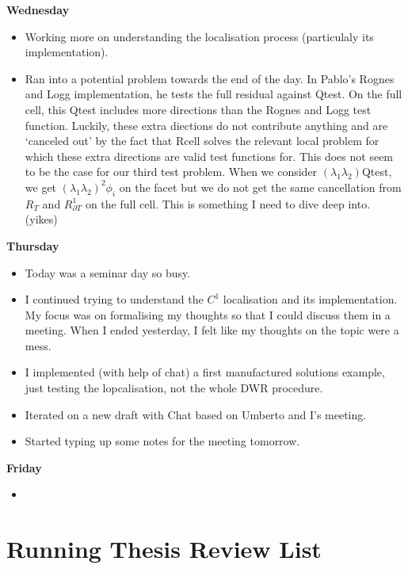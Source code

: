 \documentclass[12pt,a4paper]{article}
\begin{document}
\textbf{Wednesday}

\begin{itemize}
    \item Working more on understanding the localisation process (particulaly its implementation).
    \item Ran into a potential problem towards the end of the day. In Pablo's Rognes and Logg implementation, he tests the full residual against Qtest. On the full cell, this Qtest includes more directions than the Rognes and Logg test function. Luckily, these extra diections do not contribute anything and are `canceled out' by the fact that Rcell solves the relevant local problem for which these extra directions are valid test functions for. This does not seem to be the case for our third test problem. When we consider $(\lambda_1 \lambda_2)$Qtest, we get $(\lambda_1\lambda_2)^2 \phi_i$ on the facet but we do not get the same cancellation from $R_T$ and $R_{\partial T}^1$ on the full cell. This is something I need to dive deep into. (yikes)
\end{itemize}

\textbf{Thursday}
\begin{itemize}
    \item Today was a seminar day so busy.
    \item I continued trying to understand the $C^1$ localisation and its implementation. My focus was on formalising my thoughts so that I could discuss them in a meeting. When I ended yesterday, I felt like my thoughts on the topic were a mess.
    \item I implemented (with help of chat) a first manufactured solutions example, just testing the lopcalisation, not the whole DWR procedure. 
    \item Iterated on a new draft with Chat based on Umberto and I's meeting. 
    \item Started typing up some notes for the meeting tomorrow. 
\end{itemize}

\textbf{Friday}

\begin{itemize}
    \item
\end{itemize}



\newpage

\section{Running Thesis Review List}
\end{document}
